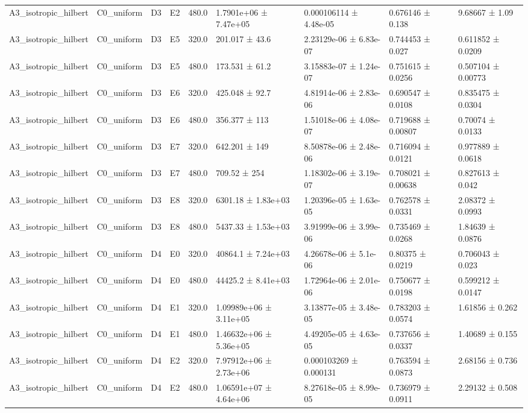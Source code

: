 \begin{table}
\begin{tabular}{lllllllll}
A3\_isotropic\_hilbert & C0\_uniform & D3 & E2 & 480.0 & 1.7901e+06 ± 7.47e+05 & 0.000106114 ± 4.48e-05 & 0.676146 ± 0.138 & 9.68667 ± 1.09 \\
A3\_isotropic\_hilbert & C0\_uniform & D3 & E5 & 320.0 & 201.017 ± 43.6 & 2.23129e-06 ± 6.83e-07 & 0.744453 ± 0.027 & 0.611852 ± 0.0209 \\
A3\_isotropic\_hilbert & C0\_uniform & D3 & E5 & 480.0 & 173.531 ± 61.2 & 3.15883e-07 ± 1.24e-07 & 0.751615 ± 0.0256 & 0.507104 ± 0.00773 \\
A3\_isotropic\_hilbert & C0\_uniform & D3 & E6 & 320.0 & 425.048 ± 92.7 & 4.81914e-06 ± 2.83e-06 & 0.690547 ± 0.0108 & 0.835475 ± 0.0304 \\
A3\_isotropic\_hilbert & C0\_uniform & D3 & E6 & 480.0 & 356.377 ± 113 & 1.51018e-06 ± 4.08e-07 & 0.719688 ± 0.00807 & 0.70074 ± 0.0133 \\
A3\_isotropic\_hilbert & C0\_uniform & D3 & E7 & 320.0 & 642.201 ± 149 & 8.50878e-06 ± 2.48e-06 & 0.716094 ± 0.0121 & 0.977889 ± 0.0618 \\
A3\_isotropic\_hilbert & C0\_uniform & D3 & E7 & 480.0 & 709.52 ± 254 & 1.18302e-06 ± 3.19e-07 & 0.708021 ± 0.00638 & 0.827613 ± 0.042 \\
A3\_isotropic\_hilbert & C0\_uniform & D3 & E8 & 320.0 & 6301.18 ± 1.83e+03 & 1.20396e-05 ± 1.63e-05 & 0.762578 ± 0.0331 & 2.08372 ± 0.0993 \\
A3\_isotropic\_hilbert & C0\_uniform & D3 & E8 & 480.0 & 5437.33 ± 1.53e+03 & 3.91999e-06 ± 3.99e-06 & 0.735469 ± 0.0268 & 1.84639 ± 0.0876 \\
A3\_isotropic\_hilbert & C0\_uniform & D4 & E0 & 320.0 & 40864.1 ± 7.24e+03 & 4.26678e-06 ± 5.1e-06 & 0.80375 ± 0.0219 & 0.706043 ± 0.023 \\
A3\_isotropic\_hilbert & C0\_uniform & D4 & E0 & 480.0 & 44425.2 ± 8.41e+03 & 1.72964e-06 ± 2.01e-06 & 0.750677 ± 0.0198 & 0.599212 ± 0.0147 \\
A3\_isotropic\_hilbert & C0\_uniform & D4 & E1 & 320.0 & 1.09989e+06 ± 3.11e+05 & 3.13877e-05 ± 3.48e-05 & 0.783203 ± 0.0574 & 1.61856 ± 0.262 \\
A3\_isotropic\_hilbert & C0\_uniform & D4 & E1 & 480.0 & 1.46632e+06 ± 5.36e+05 & 4.49205e-05 ± 4.63e-05 & 0.737656 ± 0.0337 & 1.40689 ± 0.155 \\
A3\_isotropic\_hilbert & C0\_uniform & D4 & E2 & 320.0 & 7.97912e+06 ± 2.73e+06 & 0.000103269 ± 0.000131 & 0.763594 ± 0.0873 & 2.68156 ± 0.736 \\
A3\_isotropic\_hilbert & C0\_uniform & D4 & E2 & 480.0 & 1.06591e+07 ± 4.64e+06 & 8.27618e-05 ± 8.99e-05 & 0.736979 ± 0.0911 & 2.29132 ± 0.508 \\

\end{tabular}
\end{table}
